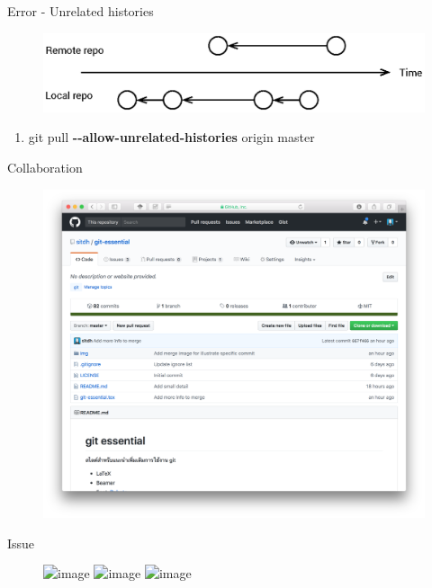 \documentclass{beamer}
\begin{document}
\begin{frame}{Error - Unrelated histories}
    \begin{figure}
        \center
        \includegraphics[width=\textwidth]{git-unrelated-histories}
        \label{fig:git-unrelated-histories}
    \end{figure}

    \begin{enumerate}[\$]
        \item<2> \Large{git pull \textbf{-{}-allow-unrelated-histories} origin master}
    \end{enumerate}
\end{frame}

\begin{frame}{Collaboration}
    \begin{figure}
        \center
        \includegraphics[width=.8\textwidth]{git-essential-0}
        \label{fig:git-essential-0}
    \end{figure}
\end{frame}

\begin{frame}{Issue}
    \begin{figure}
        \center
        \includegraphics<1>[width=.8\textwidth]{git-essential-1}
        \includegraphics<2>[width=.8\textwidth]{git-essential-2}
        \includegraphics<3>[width=.8\textwidth]{git-essential-3}
        \label{fig:git-essential-1}
    \end{figure}
\end{frame}
\end{document}
